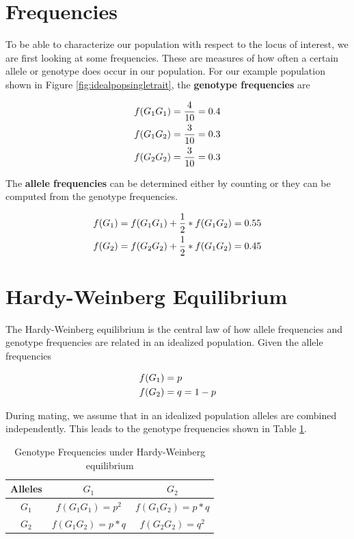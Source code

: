 \documentclass[
]{book}
\theoremstyle{definition}
\theoremstyle{definition}
\theoremstyle{definition}
\theoremstyle{remark}
\begin{document}
\hypertarget{qg-frequency}{%
\section{Frequencies}\label{qg-frequency}}

To be able to characterize our population with respect to the locus of interest, we are first looking at some frequencies. These are measures of how often a certain allele or genotype does occur in our population. For our example population shown in Figure \ref{fig:idealpopsingletrait}, the \textbf{genotype frequencies} are

\begin{align}
f(G_1G_1) &= \frac{4}{10} = 0.4 \notag \\
f(G_1G_2) &= \frac{3}{10} = 0.3 \notag \\
f(G_2G_2) &= \frac{3}{10} = 0.3  \label{eq:genotypefreq}
\end{align}

The \textbf{allele frequencies} can be determined either by counting or they can be computed from the genotype frequencies.

\begin{align}
f(G_1) &= f(G_1G_1) + {1\over 2}*f(G_1G_2) = 0.55 \notag \\
f(G_2) &= f(G_2G_2) + {1\over 2}*f(G_1G_2) = 0.45 \label{eq:allelefreq}
\end{align}

\hypertarget{hw-eq}{%
\section{Hardy-Weinberg Equilibrium}\label{hw-eq}}

The Hardy-Weinberg equilibrium is the central law of how allele frequencies and genotype frequencies are related in an idealized population. Given the allele frequencies

\begin{align}
f(G_1) &= p \notag \\
f(G_2) &= q = 1-p
\label{eq:allelefreq}
\end{align}

During mating, we assume that in an idealized population alleles are combined independently. This leads to the genotype frequencies shown in Table \ref{tab:tabgenfreq}.

\begin{table}

\caption{\label{tab:tabgenfreq}Genotype Frequencies under Hardy-Weinberg equilibrium}
\centering
\begin{tabular}[t]{ccc}
\toprule
Alleles & $G_1$ & $G_2$\\
\midrule
$G_1$ & $f(G_1G_1) = p^2$ & $f(G_1G_2) = p*q$\\
$G_2$ & $f(G_1G_2) = p*q$ & $f(G_2G_2) = q^2$\\
\bottomrule
\end{tabular}
\end{table}
\end{document}
